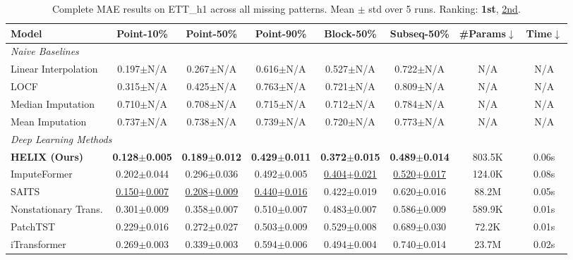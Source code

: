 \begin{table}[h]
    \caption{Complete MAE results on ETT\_h1 across all missing patterns. Mean $\pm$ std over 5 runs. Ranking: \textbf{1st}, \underline{2nd}.}
    \label{tab:full_ett_h1}
    \centering
    \begin{footnotesize}
    \begin{tabular}{l|ccccc|cc}
        \toprule
        \textbf{Model} & \textbf{Point-10\%} & \textbf{Point-50\%} & \textbf{Point-90\%} & \textbf{Block-50\%} & \textbf{Subseq-50\%} & \textbf{\#Params}$\downarrow$ & \textbf{Time}$\downarrow$ \\
        \midrule
        \multicolumn{8}{l}{\textit{Naive Baselines}} \\
        Linear Interpolation & 0.197$\pm$N/A & 0.267$\pm$N/A & 0.616$\pm$N/A & 0.527$\pm$N/A & 0.722$\pm$N/A & N/A & N/A \\
        LOCF & 0.315$\pm$N/A & 0.425$\pm$N/A & 0.763$\pm$N/A & 0.721$\pm$N/A & 0.809$\pm$N/A & N/A & N/A \\
        Median Imputation & 0.710$\pm$N/A & 0.708$\pm$N/A & 0.715$\pm$N/A & 0.712$\pm$N/A & 0.784$\pm$N/A & N/A & N/A \\
        Mean Imputation & 0.737$\pm$N/A & 0.738$\pm$N/A & 0.739$\pm$N/A & 0.720$\pm$N/A & 0.773$\pm$N/A & N/A & N/A \\
        \midrule
        \multicolumn{8}{l}{\textit{Deep Learning Methods}} \\
        \textbf{HELIX (Ours)} & \textbf{0.128$\pm$0.005} & \textbf{0.189$\pm$0.012} & \textbf{0.429$\pm$0.011} & \textbf{0.372$\pm$0.015} & \textbf{0.489$\pm$0.014} & 803.5K & 0.06s \\
        ImputeFormer & 0.202$\pm$0.044 & 0.296$\pm$0.036 & 0.492$\pm$0.005 & \underline{0.404$\pm$0.021} & \underline{0.520$\pm$0.017} & 124.0K & 0.08s \\
        SAITS & \underline{0.150$\pm$0.007} & \underline{0.208$\pm$0.009} & \underline{0.440$\pm$0.016} & 0.422$\pm$0.019 & 0.620$\pm$0.016 & 88.2M & 0.05s \\
        Nonstationary Trans. & 0.301$\pm$0.009 & 0.358$\pm$0.007 & 0.510$\pm$0.007 & 0.483$\pm$0.007 & 0.586$\pm$0.009 & 589.9K & 0.01s \\
        PatchTST & 0.229$\pm$0.016 & 0.272$\pm$0.027 & 0.503$\pm$0.009 & 0.529$\pm$0.008 & 0.689$\pm$0.030 & 72.2K & 0.01s \\
        iTransformer & 0.269$\pm$0.003 & 0.339$\pm$0.003 & 0.594$\pm$0.006 & 0.494$\pm$0.004 & 0.740$\pm$0.014 & 23.7M & 0.02s \\

\end{tabular}
\end{footnotesize}
\end{table}
